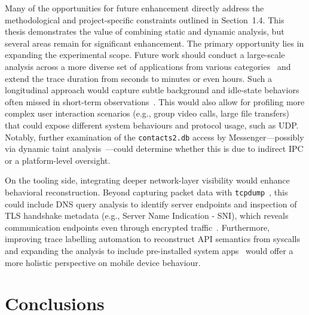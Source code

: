 \documentclass[a4paper,12pt]{report}
\begin{document}
Many of the opportunities for future enhancement directly address the methodological and project-specific constraints outlined in Section~1.4. This thesis demonstrates the value of combining static and dynamic analysis, but several areas remain for significant enhancement. The primary opportunity lies in expanding the experimental scope. Future work should conduct a large-scale analysis across a more diverse set of applications from various categories~\cite{lindorfer2014andrubis} and extend the trace duration from seconds to minutes or even hours. Such a longitudinal approach would capture subtle background and idle-state behaviors often missed in short-term observations~\cite{Razaghpanah2020AppsTrackers}. This would also allow for profiling more complex user interaction scenarios (e.g., group video calls, large file transfers) that could expose different system behaviours and protocol usage, such as UDP. Notably, further examination of the \texttt{contacts2.db} access by Messenger—possibly via dynamic taint analysis~\cite{enck2014taintdroid}—could determine whether this is due to indirect IPC or a platform-level oversight.

On the tooling side, integrating deeper network-layer visibility would enhance behavioral reconstruction. Beyond capturing packet data with \texttt{tcpdump}~\cite{lindorfer2014andrubis}, this could include DNS query analysis to identify server endpoints and inspection of TLS handshake metadata (e.g., Server Name Indication - SNI), which reveals communication endpoints even through encrypted traffic~\cite{apthorpe2018smart}. Furthermore, improving trace labelling automation to reconstruct API semantics from syscalls~\cite{nisi2019syscall} and expanding the analysis to include pre-installed system apps~\cite{Tian2020Preinstalled} would offer a more holistic perspective on mobile device behaviour.


\chapter{Conclusions}
\end{document}
